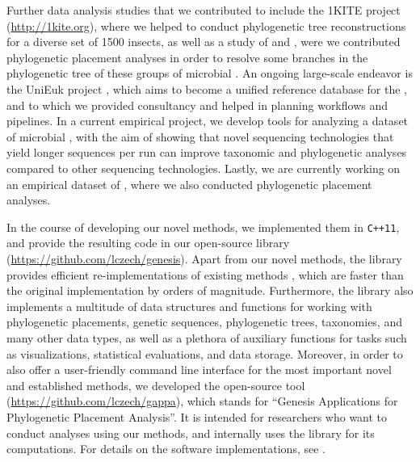 Further data analysis studies that we contributed to include the 1KITE project \cite{Misof2014} (\url{http://1kite.org}),
where we helped to conduct phylogenetic tree reconstructions for a diverse set of \num{1500} insects,
as well as a study of  and  \cite{Bass2018a},
were we contributed phylogenetic placement analyses
in order to resolve some branches in the phylogenetic tree of these groups of microbial .
An ongoing large-scale endeavor is the UniEuk project \cite{Berney2017},
which aims to become a unified reference database for the ,
and to which we provided consultancy and helped in planning workflows and pipelines.
In a current empirical project, we develop tools for analyzing a dataset of microbial ,
with the aim of showing that novel sequencing technologies that yield longer sequences per run
can improve taxonomic and phylogenetic analyses compared to other sequencing technologies.
Lastly, we are currently working on an empirical dataset of ,
where we also conducted phylogenetic placement analyses.

In the course of developing our novel methods, we implemented them in \texttt{C++11},
and provide the resulting code in our open-source library  (\url{https://github.com/lczech/genesis}).
Apart from our novel methods, the library provides efficient re-implementations of existing methods \cite{Matsen2010},
which are faster than the original implementation by orders of magnitude.
Furthermore, the library also implements a multitude of data structures and functions for working with
phylogenetic placements, genetic sequences, phylogenetic trees, taxonomies, and many other data types,
as well as a plethora of auxiliary functions for tasks such as visualizations, statistical evaluations, and data storage.
Moreover, in order to also offer a user-friendly command line interface for the most important novel and established methods,
we developed the open-source tool  (\url{https://github.com/lczech/gappa}),
which stands for ``Genesis Applications for Phylogenetic Placement Analysis''.
It is intended for researchers who want to conduct analyses using our methods,
and internally uses the  library for its computations.
For details on the software implementations, see .

